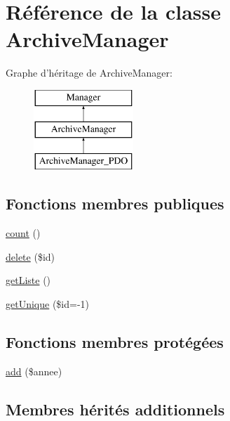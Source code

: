 \hypertarget{class_library_1_1_models_1_1_archive_manager}{\section{Référence de la classe Archive\+Manager}
\label{class_library_1_1_models_1_1_archive_manager}
}
Graphe d'héritage de Archive\+Manager\+:\begin{figure}[H]
\begin{center}
\leavevmode
\includegraphics[height=3.000000cm]{class_library_1_1_models_1_1_archive_manager}
\end{center}
\end{figure}
\subsection*{Fonctions membres publiques}
\begin{DoxyCompactItemize}
\item 
\hyperlink{class_library_1_1_models_1_1_archive_manager_ac751e87b3d4c4bf2feb03bee8b092755}{count} ()
\item 
\hyperlink{class_library_1_1_models_1_1_archive_manager_a2f8258add505482d7f00ea26493a5723}{delete} (\$id)
\item 
\hyperlink{class_library_1_1_models_1_1_archive_manager_a20b3a2f576f3ea746f769779a329491e}{get\+Liste} ()
\item 
\hyperlink{class_library_1_1_models_1_1_archive_manager_ace29bfa06606e8b8ed9cb411e44cd60b}{get\+Unique} (\$id=-\/1)
\end{DoxyCompactItemize}
\subsection*{Fonctions membres protégées}
\begin{DoxyCompactItemize}
\item 
\hyperlink{class_library_1_1_models_1_1_archive_manager_a2f55e3d8e4dfc1112650de2d77f112ec}{add} (\$annee)
\end{DoxyCompactItemize}
\subsection*{Membres hérités additionnels}


